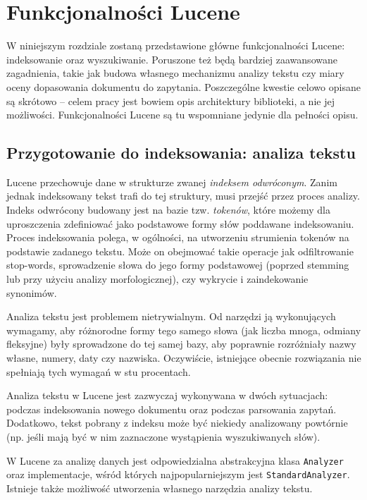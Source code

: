\chapter{Funkcjonalności Lucene}

W niniejszym rozdziale zostaną przedstawione główne funkcjonalności Lucene: indeksowanie oraz wyszukiwanie. Poruszone też będą bardziej zaawansowane zagadnienia, takie jak budowa własnego mechanizmu analizy tekstu czy miary oceny dopasowania dokumentu do zapytania. Poszczególne kwestie celowo opisane są skrótowo -- celem pracy jest bowiem opis architektury biblioteki, a nie jej możliwości. Funkcjonalności Lucene są tu wspomniane jedynie dla pełności opisu.

\section{Przygotowanie do indeksowania: analiza tekstu}

Lucene przechowuje dane w strukturze zwanej \emph{indeksem odwróconym}. Zanim jednak indeksowany tekst trafi do tej struktury, musi przejść przez proces analizy. Indeks odwrócony budowany jest na bazie tzw. \emph{tokenów}, które możemy dla uproszczenia zdefiniować jako podstawowe formy słów poddawane indeksowaniu. Proces indeksowania polega, w ogólności, na utworzeniu strumienia tokenów na podstawie zadanego tekstu. Może on obejmować takie operacje jak odfiltrowanie stop-words, sprowadzenie słowa do jego formy podstawowej (poprzed stemming lub przy użyciu analizy morfologicznej), czy wykrycie i zaindekowanie synonimów. 

Analiza tekstu jest problemem nietrywialnym. Od narzędzi ją wykonujących wymagamy, aby różnorodne formy tego samego słowa (jak liczba mnoga, odmiany fleksyjne) były sprowadzone do tej samej bazy, aby poprawnie rozróżniały nazwy własne, numery, daty czy nazwiska. Oczywiście, istniejące obecnie rozwiązania nie spełniają tych wymagań w stu procentach.

Analiza tekstu w Lucene jest zazwyczaj wykonywana w dwóch sytuacjach: podczas indeksowania nowego dokumentu oraz podczas parsowania zapytań. Dodatkowo, tekst pobrany z indeksu może być niekiedy analizowany powtórnie (np. jeśli mają być w nim zaznaczone wystąpienia wyszukiwanych słów).

W Lucene za analizę danych jest odpowiedzialna abstrakcyjna klasa \texttt{Analyzer} oraz implementacje, wśród których najpopularniejszym jest \texttt{StandardAnalyzer}. Istnieje także możliwość utworzenia własnego narzędzia analizy tekstu. 

